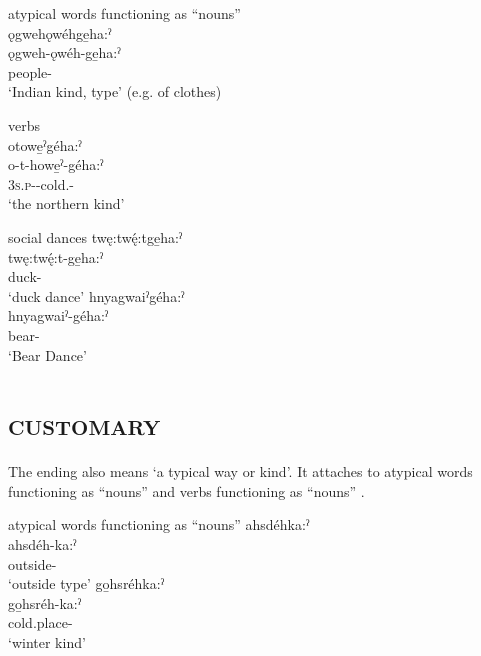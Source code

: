 \ea\label{ex:gehax} atypical words functioning as “nouns”\\
ǫgwehǫwéhge̱ha:ˀ\\
\gll ǫgweh-ǫwéh-ge̱ha:ˀ \\
people-\exsc{\typicalizer-\customary}\\
\glt ‘Indian kind, type’ (e.g. of clothes) 
\z


\ea\label{ex:gehax3} verbs\\
otowe̱ˀgéha:ˀ\\
\gll o-t-howe̱ˀ-géha:ˀ\\
 \textsc{3s.p}-{\semireflexive}-cold.{\stative}-\exsc{\customary}\\
\glt `the northern kind'
\z

\newpage
\ea\label{ex:gehax2} social dances
\ea twę:twę́:tge̱ha:ˀ\\
\gll twę:twę́:t-ge̱ha:ˀ\\
 duck-{\customary}\\
\glt `duck dance'
\ex hnyagwaiˀgéha:ˀ\\
\gll hnyagwaiˀ-géha:ˀ\\
 bear-{\customary}\\
\glt `Bear Dance'
\z
\z



\section{ \textsc{customary}} \label{-ka:ˀ}
The  \textsc{\customary} ending also means ‘a typical way or kind’. It attaches to atypical words functioning as “nouns”  and verbs functioning as “nouns” .

\ea\label{ex:kaex} atypical words functioning as “nouns”
\ea ahsdéhka:ˀ\\
\gll ahsdéh-ka:ˀ\\
 outside-{\customary}\\
\glt `outside type'
\ex go̱hsréhka:ˀ\\
\gll go̱hsréh-ka:ˀ\\
 cold.place-{\customary}\\
\glt `winter kind'
\z
\z

